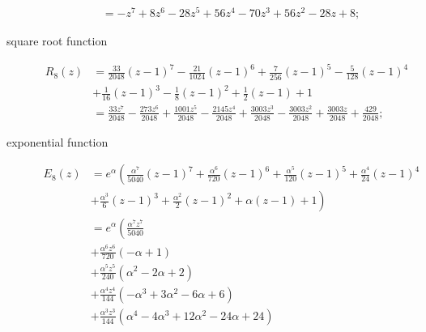 \begin{description}
\begin{displaymath}
\begin{split}
                             &= - z^{7} + 8 z^{6} - 28 z^{5} + 56 z^{4} - 70 z^{3} + 56 z^{2} - 28 z + 8;
    \end{split}
\end{displaymath}
\item[square root function]
\begin{displaymath}
    \begin{split}
        R_{8}{\left (z \right )}  &= \frac{33}{2048} \left(z - 1\right)^{7} - \frac{21}{1024} \left(z - 1\right)^{6} + \frac{7}{256} \left(z - 1\right)^{5} - \frac{5}{128} \left(z - 1\right)^{4}\\
                              &+ \frac{1}{16} \left(z - 1\right)^{3} - \frac{1}{8} \left(z - 1\right)^{2} + \frac{1}{2}(z-1) + 1 \\
                              &= \frac{33 z^{7}}{2048} - \frac{273 z^{6}}{2048} + \frac{1001 z^{5}}{2048} - \frac{2145 z^{4}}{2048} + \frac{3003 z^{3}}{2048} - \frac{3003 z^{2}}{2048} + \frac{3003 z}{2048} + \frac{429}{2048};
    \end{split}
\end{displaymath}
\item[exponential function]
\begin{equation}
    \begin{split}
        E_{8}{\left (z \right )}    &= e^{\alpha} \left(\frac{\alpha^{7} }{5040} \left(z - 1\right)^{7} + \frac{\alpha^{6} }{720} \left(z - 1\right)^{6} + \frac{\alpha^{5} }{120} \left(z - 1\right)^{5} + \frac{\alpha^{4} }{24} \left(z - 1\right)^{4}\right.\\
                                &+ \left. \frac{\alpha^{3} }{6} \left(z - 1\right)^{3} + \frac{\alpha^{2} }{2} \left(z - 1\right)^{2} + \alpha \left(z - 1\right)  + 1\right)\\
                                &= e^{\alpha}\left(\frac{\alpha^{7} z^{7}}{5040}\right. \\
                                &+ \frac{\alpha^{6} z^{6}}{720} \left(- \alpha + 1\right) \\
                                &+ \frac{\alpha^{5} z^{5}}{240} \left(\alpha^{2} - 2 \alpha + 2\right) \\
                                &+ \frac{\alpha^{4} z^{4}}{144} \left(- \alpha^{3} + 3 \alpha^{2} - 6 \alpha + 6\right) \\
                                &+ \frac{\alpha^{3} z^{3}}{144} \left(\alpha^{4} - 4 \alpha^{3} + 12 \alpha^{2} - 24 \alpha + 24\right) \\

\end{split}
\end{equation}
\end{description}
